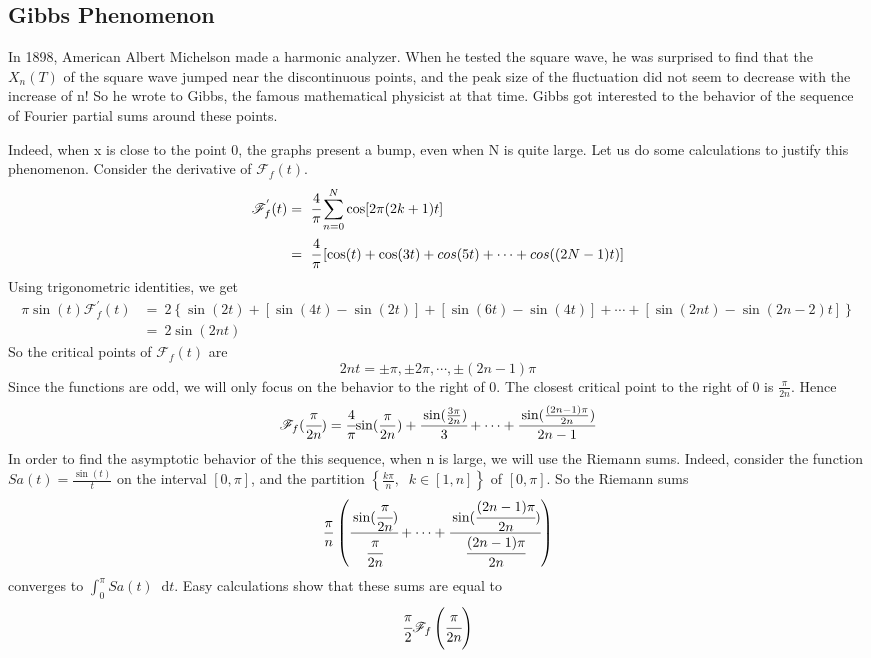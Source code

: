 \documentclass[margin,line]{res}
\newcommand*{\dif}{\mathop{}\!\mathrm{d}}
\begin{document}
\begin{resume}
\subsection{\textbf{Gibbs Phenomenon}}
In 1898, American Albert Michelson made a harmonic analyzer. When he tested the square wave, he was surprised to find that the $X_n(T)$ of the square wave jumped near the discontinuous points, and the peak size of the fluctuation did not seem to decrease with the increase of n! So he wrote to Gibbs, the famous mathematical physicist at that time. Gibbs got interested to the behavior of the sequence of Fourier partial sums around these points. \par
Indeed, when x is close to the point 0, the graphs present a bump, even when N is quite large. Let us do some calculations to justify this phenomenon. Consider the derivative of $\mathscr{F}_f(t)$.
\begin{align}
\mathscr{F}^{'}_f(t) 
	&= \ \cfrac{4}{\pi} \sum\limits_{n=0}^N{\cos [2\pi (2k+1)t]} \nonumber \\
	&= \ \cfrac{4}{\pi} \left[ \cos(t) + \cos(3t) + cos(5t) + \cdots + cos((2N-1)t) \right] \nonumber 
\end{align}
Using trigonometric identities, we get 
\begin{align}
\pi\sin(t) \mathscr{F}^{'}_f(t) 
	&= \ 2\left\{ \sin(2t) + \left[\sin(4t)-\sin(2t)\right] + \left[\sin(6t)-\sin(4t)\right] + \cdots + \left[ \sin(2nt)-\sin(2n-2)t \right] \right\} \nonumber \\
	&= \ 2\sin(2nt) \nonumber
\end{align}
So the critical points of $\mathscr{F}_f(t)$ are 
$$
2nt = \pm\pi , \pm 2\pi,\cdots,\pm (2n-1)\pi
$$
Since the functions are odd, we will only focus on the behavior to the right of 0. The closest critical point to the right of 0 is $\frac{\pi}{2n}$. Hence 
$$
\mathscr{F}_f(\cfrac{\pi}{2n}) = \cfrac{4}{\pi} {
	\sin(\frac{\pi}{2n}) + \cfrac{\sin(\frac{3\pi}{2n})}{3} + \cdots +
	\cfrac{\sin(\frac{(2n-1)\pi}{2n})}{2n-1}
}
$$
In order to find the asymptotic behavior of the this sequence, when n is large, we will use the Riemann sums. Indeed, consider the function $Sa(t) = \frac{\sin(t)}{t}$ on the interval $[0,\pi]$, and the partition $\left\{{\frac{k\pi}{n}}, \;\;k \in [1,n]\right\}$ of $[0,\pi]$. So the Riemann sums
$$
\frac{\pi}{n}
\left(
	\cfrac{\sin(\cfrac{\pi}{2n})}{\cfrac{\pi}{2n}} + \cdots +
	\cfrac{\sin(\cfrac{(2n-1)\pi}{2n})}{\cfrac{(2n-1)\pi}{2n}}
\right)
$$
converges to $\int_{0}^{\pi} Sa(t) \dif t$. Easy calculations show that these sums are equal to 
$$
\cfrac{\pi}{2}{\mathscr{F}_f \left( \cfrac{\pi}{2n} \right) }
$$


\end{resume}
\end{document}
